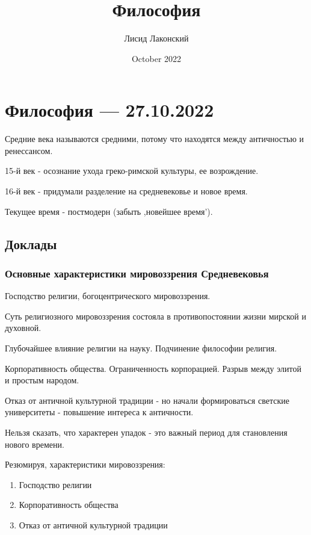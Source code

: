 \documentclass{article}
\title{Философия}
\author{Лисид Лаконский}
\date{October 2022}
\begin{document}
\maketitle
\tableofcontents
\pagebreak

\section{Философия — 27.10.2022}

\begin{flushleft}

Средние века называются средними, потому что находятся между античностью и ренессансом.

\hfill

15-й век - осознание ухода греко-римской культуры, ее возрождение.

16-й век - придумали разделение на средневековье и новое время.

\hfill

Текущее время - постмодерн (забыть ,новейшее время').

\subsection{Доклады}

\subsubsection{Основные характеристики мировоззрения Средневековья}

Господство религии, богоцентрического мировоззрения.

Суть религиозного мировоззрения состояла в противопостоянии жизни мирской и духовной.

Глубочайшее влияние религии на науку. Подчинение философии религия.

Корпоративность общества. Ограниченность корпорацией. Разрыв между элитой и простым народом.

Отказ от античной культурной традиции - но начали формироваться светские университеты - повышение интереса к античности.

\hfill

Нельзя сказать, что характерен упадок - это важный период для становления нового времени.

Резюмируя, характеристики мировоззрения:

\begin{enumerate}
    \item Господство религии
    \item Корпоративность общества
    \item Отказ от античной культурной традиции
\end{enumerate}


\end{flushleft}
\end{document}
